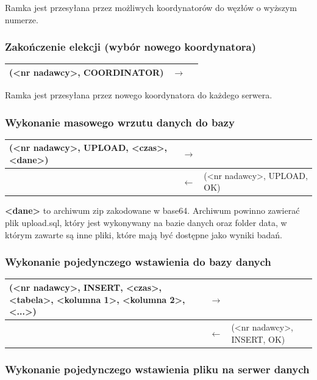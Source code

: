 Ramka jest przesyłana przez możliwych koordynatorów do węzłów o wyższym numerze.

\subsubsection{Zakończenie elekcji (wybór nowego koordynatora)}

\begin{longtable}{| p{} | p{}| p{} |} 
\hline
(<nr nadawcy>, COORDINATOR) & $\rightarrow$ &  \\ \hline
\end{longtable}

Ramka jest przesyłana przez nowego koordynatora do każdego serwera.

\subsubsection{Wykonanie masowego wrzutu danych do bazy}

\begin{longtable}{| p{} | p{}| p{} |} 
\hline
(<nr nadawcy>, UPLOAD, <czas>, <dane>) & $\rightarrow$ &  \\ \hline
 & $\leftarrow$ & (<nr nadawcy>, UPLOAD, OK) \\ \hline
\end{longtable}

\textbf{<dane>} to archiwum zip zakodowane w base64. Archiwum powinno zawierać plik upload.sql, który jest wykonywany na bazie danych oraz folder data, w którym zawarte są inne pliki, które mają być dostępne jako wyniki badań.

\subsubsection{Wykonanie pojedynczego wstawienia do bazy danych}

\begin{longtable}{| p{} | p{}| p{} |} 
\hline
(<nr nadawcy>, INSERT, <czas>, <tabela>, <kolumna 1>, <kolumna 2>, <...>) & $\rightarrow$ &  \\ \hline
 & $\leftarrow$ & (<nr nadawcy>, INSERT, OK) \\ \hline
\end{longtable}

\subsubsection{Wykonanie pojedynczego wstawienia pliku na serwer danych}

